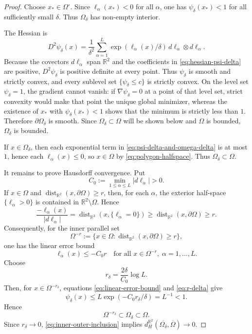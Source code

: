 \documentclass[11pt]{amsart}
\numberwithin{equation}{section}
\DeclareMathOperator{\dist}{dist}
\newcommand{\R}{\mathbb R}
\newcommand{\Om}{\Omega}
\begin{document}
\begin{proof}
Choose $x_*\in\Om^\circ$.  Since $\ell_\alpha(x_*)<0$ for all $\alpha$, one has
$\psi_\delta(x_*)<1$ for all sufficiently small $\delta$.  Thus $\Om_\delta$ has
non-empty interior.

The Hessian is
\begin{equation}\label{eq:hessian-psi-delta}
D^2\psi_\delta(x)=\frac{1}{\delta^2}\sum_{\alpha=1}^{L}
\exp(\ell_\alpha(x)/\delta)\,d\ell_\alpha\otimes d\ell_\alpha .
\end{equation}
Because the covectors $d\ell_\alpha$ span $\R^2$ and the coefficients in
\eqref{eq:hessian-psi-delta} are positive, $D^2\psi_\delta$ is positive definite
at every point.  Thus $\psi_\delta$ is smooth and strictly convex, and every
sublevel set $\{\psi_\delta\le c\}$ is strictly convex.  On the level set
$\psi_\delta=1$, the gradient cannot vanish: if $\nabla\psi_\delta=0$ at a point
of that level set, strict convexity would make that point the unique global
minimizer, whereas the existence of $x_*$ with $\psi_\delta(x_*)<1$ shows that
the minimum is strictly less than $1$.  Therefore $\partial\Om_\delta$ is smooth.
Since $\Om_\delta\subset\Om$ will be shown below and $\Om$ is bounded,
$\Om_\delta$ is bounded.

If $x\in\Om_\delta$, then each exponential term in \eqref{eq:psi-delta-and-omega-delta}
is at most $1$, hence each $\ell_\alpha(x)\le0$, so $x\in\Om$ by
\eqref{eq:polygon-halfspace}.  Thus $\Om_\delta\subset\Om$.

It remains to prove Hausdorff convergence.  Put
$$
C_0:=\min_{1\le\alpha\le L}|d\ell_\alpha|>0.
$$
If $x\in\Om$ and $\dist_{\R^2}(x,\partial\Om)\ge r$, then, for each $\alpha$, the exterior
half-space $\{\ell_\alpha>0\}$ is contained in $\R^2\setminus\Om$.  Hence
$$
\frac{-\ell_\alpha(x)}{|d\ell_\alpha|}
=\dist_{\R^2}(x,\{\ell_\alpha=0\})
\ge \dist_{\R^2}(x,\partial\Om)
\ge r.
$$
Consequently, for the inner parallel set
$$
\Om^{-r}:=\{x\in\Om:\dist_{\R^2}(x,\partial\Om)\ge r\},
$$
one has the linear error bound
\begin{equation}\label{eq:linear-error-bound}
\ell_\alpha(x)\le -C_0 r
\quad\text{for all }x\in\Om^{-r},\;\alpha=1,\ldots,L.
\end{equation}
Choose
\begin{equation}\label{eq:r-delta}
r_\delta=\frac{2\delta}{C_0}\log L.
\end{equation}
Then, for $x\in\Om^{-r_\delta}$, equations \eqref{eq:linear-error-bound} and
\eqref{eq:r-delta} give
$$
\psi_\delta(x)\le L\exp(-C_0r_\delta/\delta)=L^{-1}<1.
$$
Hence
\begin{equation}\label{eq:inner-outer-inclusion}
\Om^{-r_\delta}\subset\Om_\delta\subset\Om.
\end{equation}
Since $r_\delta\to0$, \eqref{eq:inner-outer-inclusion} implies
$d_H^{\R^2}(\overline{\Om_\delta},\overline\Om)\to0$.


\end{proof}
\end{document}
